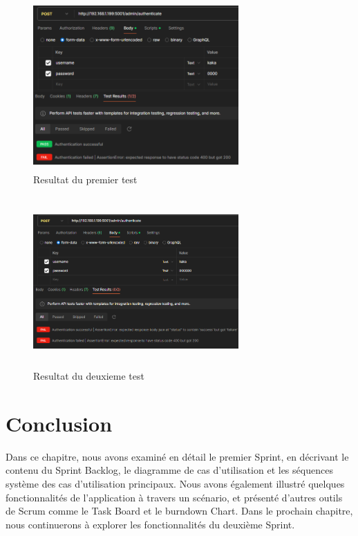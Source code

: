 \newpage
\begin{figure}[ht!]
  \centering
  \includegraphics[width=0.7\textwidth, height=6.5cm]{chap3.images/cas1.png}
  \caption{ Resultat du premier test }

\end{figure}

\begin{figure}[ht!]
  \centering
  \includegraphics[width=0.7\textwidth, height=6.5cm]{chap3.images/cas2.png}
  \caption{ Resultat du deuxieme test }

\end{figure}

\section*{Conclusion}
\bigskip
\begin{sloppypar}
  Dans ce chapitre, nous avons examiné en détail le premier Sprint, en décrivant le contenu du Sprint Backlog, le diagramme de cas d'utilisation et les séquences système des cas d'utilisation principaux. Nous avons également illustré quelques fonctionnalités de l'application à travers un scénario, et présenté d'autres outils de Scrum comme le Task Board et le burndown Chart. Dans le prochain chapitre, nous continuerons à explorer les fonctionnalités du deuxième Sprint.
\end{sloppypar}
